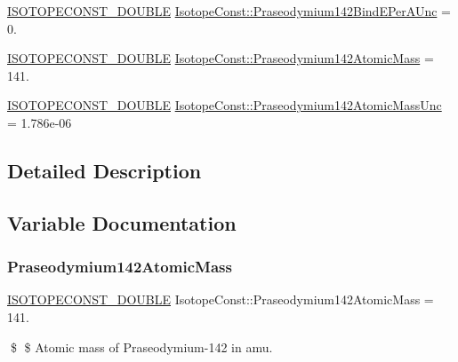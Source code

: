 \begin{DoxyCompactItemize}
\item 
\mbox{\hyperlink{group___isotope_const-_macros_ga8f45a7272ce02c0b4c65c44636ed719a}{I\+S\+O\+T\+O\+P\+E\+C\+O\+N\+S\+T\+\_\+\+D\+O\+U\+B\+LE}} \mbox{\hyperlink{group___isotope_const-_praseodymium-_pr142_gaea8d9869c3e05a87c55ed761b8302b89}{Isotope\+Const\+::\+Praseodymium142\+Bind\+E\+Per\+A\+Unc}} = 0.
\item 
\mbox{\hyperlink{group___isotope_const-_macros_ga8f45a7272ce02c0b4c65c44636ed719a}{I\+S\+O\+T\+O\+P\+E\+C\+O\+N\+S\+T\+\_\+\+D\+O\+U\+B\+LE}} \mbox{\hyperlink{group___isotope_const-_praseodymium-_pr142_ga571e89306f9410c88aa8e90ae88f74ce}{Isotope\+Const\+::\+Praseodymium142\+Atomic\+Mass}} = 141.
\item 
\mbox{\hyperlink{group___isotope_const-_macros_ga8f45a7272ce02c0b4c65c44636ed719a}{I\+S\+O\+T\+O\+P\+E\+C\+O\+N\+S\+T\+\_\+\+D\+O\+U\+B\+LE}} \mbox{\hyperlink{group___isotope_const-_praseodymium-_pr142_ga35e84fbd1bb5ded8427ebc58fee7e774}{Isotope\+Const\+::\+Praseodymium142\+Atomic\+Mass\+Unc}} = 1.\+786e-\/06
\end{DoxyCompactItemize}


\subsection{Detailed Description}


\subsection{Variable Documentation}
\mbox{\label{group___isotope_const-_praseodymium-_pr142_ga571e89306f9410c88aa8e90ae88f74ce}} 
\subsubsection{\texorpdfstring{Praseodymium142\+Atomic\+Mass}{Praseodymium142AtomicMass}}
{\footnotesize\ttfamily \mbox{\hyperlink{group___isotope_const-_macros_ga8f45a7272ce02c0b4c65c44636ed719a}{I\+S\+O\+T\+O\+P\+E\+C\+O\+N\+S\+T\+\_\+\+D\+O\+U\+B\+LE}} Isotope\+Const\+::\+Praseodymium142\+Atomic\+Mass = 141.}

\$ \$ Atomic mass of Praseodymium-\/142 in amu. \mbox{\label{group___isotope_const-_praseodymium-_pr142_ga35e84fbd1bb5ded8427ebc58fee7e774}} 
